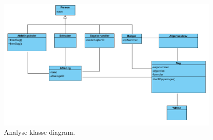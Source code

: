 \begin{figure}
  \includegraphics[width=\linewidth]{./PNG/analyseKlasseDiagram.PNG} 
  \caption{Analyse klasse diagram.}
  \label{fig:AKlasse}
\end{figure}

